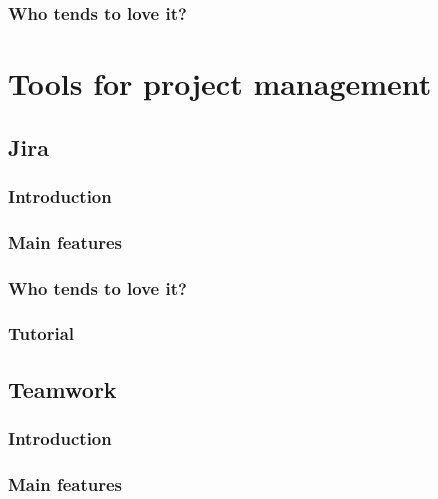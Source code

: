 \documentclass[
]{book}
\begin{document}
\hypertarget{who-tends-to-love-it-8}{%
\subsection{Who tends to love it?}\label{who-tends-to-love-it-8}}

\hypertarget{tools-for-project-management}{%
\chapter{Tools for project management}\label{tools-for-project-management}}

\hypertarget{jira}{%
\section{Jira}\label{jira}}

\hypertarget{introduction-10}{%
\subsection{Introduction}\label{introduction-10}}

\hypertarget{main-features-9}{%
\subsection{Main features}\label{main-features-9}}

\hypertarget{who-tends-to-love-it-9}{%
\subsection{Who tends to love it?}\label{who-tends-to-love-it-9}}

\hypertarget{tutorial-3}{%
\subsection{Tutorial}\label{tutorial-3}}

\hypertarget{teamwork}{%
\section{Teamwork}\label{teamwork}}

\hypertarget{introduction-11}{%
\subsection{Introduction}\label{introduction-11}}

\hypertarget{main-features-10}{%
\subsection{Main features}\label{main-features-10}}
\end{document}
